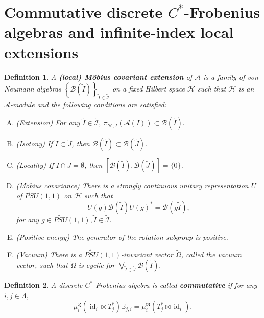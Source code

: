\documentclass{article}
\newtheorem{definition}{Definition}
\newcommand{\hilb}{\mathcal{H}}
\newcommand{\B}{\mathcal{B}}
\newcommand{\A}{\mathcal{A}}
\begin{document}
\section{Commutative discrete $C^*$-Frobenius algebras and infinite-index local extensions}

\begin{definition}
    A \textbf{(local) M\"{o}bius covariant extension} of $\A$  is a family of von Neumann algebras $\left\{\B(\widetilde{I}) \right\}_{\widetilde{I}\in\widetilde{\mathcal{I}}}$ on a fixed  Hilbert space
    $\hilb$ such that $\hilb$ is an $\A$-module and the following conditions are satisfied:
    \begin{enumerate}[(A)]
        \item (Extension) For any $\widetilde{I}\in\widetilde{\mathcal{I}},\ \pi_{\hilb,I}\left(\A(I)\right) \subset \B(\widetilde{I}) .$ 
        \item (Isotony) If $\widetilde{I} \subset \widetilde{J}$, then $\B(\widetilde{I}) \subset \B(\widetilde{J}). $ 
         \item (Locality) If $I \cap J = \emptyset$, then $[\B(\widetilde{I}), \B(\widetilde{J})] = \{0\}$.
        \item (M\"{o}bius covariance) There is a strongly continuous unitary representation $U$  of $\widetilde{PSU}(1,1)$ on $\hilb$ such that 
        \[
        U(g)\B(\widetilde{I})U(g)^*  = \B(g\widetilde{I}),
        \]
        for any $g\in \widetilde{PSU}(1,1), \widetilde{I} \in \widetilde{\mathcal{I}}.$
        \item (Positive energy) The generator of the rotation subgroup is positive.
        \item (Vacuum) There is a $\widetilde{PSU}(1,1)$-invariant vector $\widetilde{\Omega}$, called the vacuum vector, such that 
        $\widetilde{\Omega}$ is cyclic for $\bigvee_{\widetilde{I}\in\widetilde{\mathcal{I}}}\B(\widetilde{I}).$
    \end{enumerate}
\end{definition}

\begin{definition}
    A discrete $C^*$-Frobenius algebra is called \textbf{commutative} if 
    for any $i,j \in\Lambda,$
    \[
  \mu_i^{\mathfrak{L}}(\operatorname{id}_i\boxtimes T_j^*)\mathbb{B}_{j,i} = \mu_i^{\mathfrak{R}}(T_j^*\boxtimes\operatorname{id}_i).
     \]
\end{definition}
\end{document}
